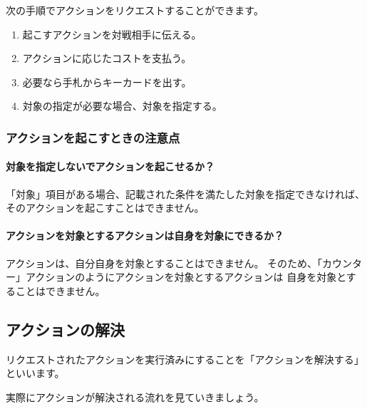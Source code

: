 \documentclass[letterpaper,10pt,dvipdfmx]{sphinxmanual}
\begin{document}
\sphinxAtStartPar
次の手順でアクションをリクエストすることができます。
\begin{enumerate}
%
\item {} 
\sphinxAtStartPar
起こすアクションを対戦相手に伝える。

\item {} 
\sphinxAtStartPar
アクションに応じたコストを支払う。

\item {} 
\sphinxAtStartPar
必要なら手札からキーカードを出す。

\item {} 
\sphinxAtStartPar
対象の指定が必要な場合、対象を指定する。

\end{enumerate}


\subsubsection{アクションを起こすときの注意点}
\label{\detokenize{common/common:id25}}

\paragraph{対象を指定しないでアクションを起こせるか？}
\label{\detokenize{common/common:id26}}
\sphinxAtStartPar
「対象」項目がある場合、記載された条件を満たした対象を指定できなければ、
そのアクションを起こすことはできません。


\paragraph{アクションを対象とするアクションは自身を対象にできるか？}
\label{\detokenize{common/common:id27}}
\sphinxAtStartPar
アクションは、自分自身を対象とすることはできません。
そのため、「カウンター」アクションのようにアクションを対象とするアクションは
自身を対象とすることはできません。


\subsection{アクションの解決}
\label{\detokenize{common/common:id28}}
\sphinxAtStartPar
リクエストされたアクションを実行済みにすることを「アクションを解決する」といいます。

\sphinxAtStartPar
実際にアクションが解決される流れを見ていきましょう。

\sphinxAtStartPar
{}
\end{document}
